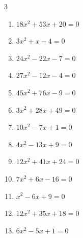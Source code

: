 \begin{multicols}{3}
\begin{enumerate}
  \item $18x^{2}+53x+20=0$


  \item $3x^{2}+x-4=0$


  \item $24x^{2}-22x-7=0$


  \item $27x^{2}-12x-4=0$


  \item $45x^{2}+76x-9=0$


  \item $3x^{2}+28x+49=0$


\columnbreak %

  \item $10x^{2}-7x+1=0$


  \item $4x^{2}-13x+9=0$


  \item $12x^{2}+41x+24=0$


  \item $7x^{2}+6x-16=0$


  \item $x^{2}-6x+9=0$

        \phantom{$\displaystyle x=3$}

  \item $12x^{2}+35x+18=0$


  \item $6x^{2}-5x+1=0$


\end{enumerate}
\end{multicols}
